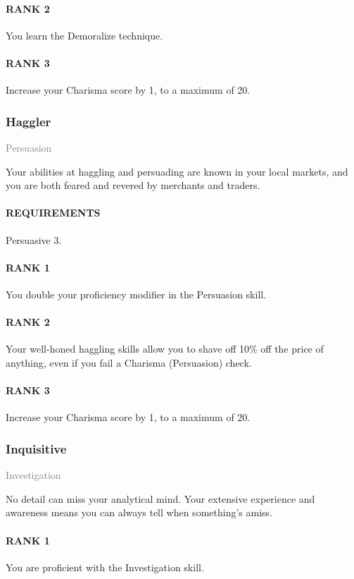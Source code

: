 \paragraph{RANK 2} You learn the Demoralize technique.
\paragraph{RANK 3} Increase your Charisma score by 1, to a maximum of 20.

\subsubsection{Haggler} \label{feat::haggler}
\small{\textcolor{gray}{Persuasion}}

\normalsize
Your abilities at haggling and persuading are known in your local markets, and you are both feared and revered by merchants and traders.
\paragraph{REQUIREMENTS} Persuasive 3.
\paragraph{RANK 1} You double your proficiency modifier in the Persuasion skill.
\paragraph{RANK 2} Your well-honed haggling skills allow you to shave off 10\% off the price of anything, even if you fail a Charisma (Persuasion) check.
\paragraph{RANK 3} Increase your Charisma score by 1, to a maximum of 20.

\subsubsection{Inquisitive} \label{feat::inquisitive}
\small{\textcolor{gray}{Investigation}}

\normalsize
No detail can miss your analytical mind.
Your extensive experience and awareness means you can always tell when something's amiss.
\paragraph{RANK 1} You are proficient with the Investigation skill.
